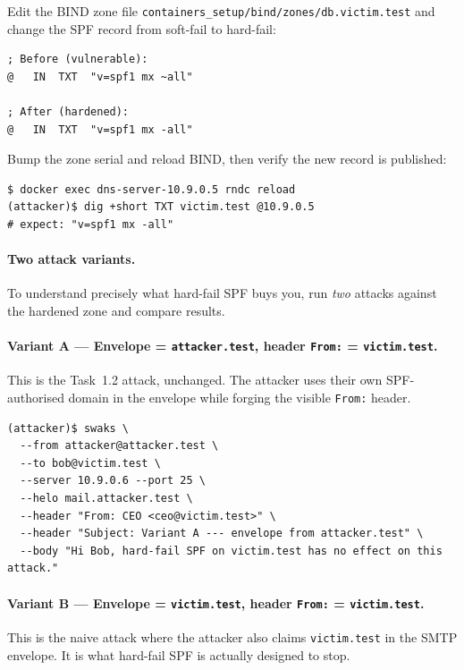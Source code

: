\documentclass[11pt]{article}
\begin{document}
Edit the BIND zone file
\texttt{containers\_setup/bind/zones/db.victim.test} and change the SPF
record from soft-fail to hard-fail:

\begin{listing}[H]
\begin{verbatim}
; Before (vulnerable):
@   IN  TXT  "v=spf1 mx ~all"

; After (hardened):
@   IN  TXT  "v=spf1 mx -all"
\end{verbatim}
\end{listing}

Bump the zone serial and reload BIND, then verify the new record is
published:

\begin{listing}[H]
\begin{verbatim}
$ docker exec dns-server-10.9.0.5 rndc reload
(attacker)$ dig +short TXT victim.test @10.9.0.5
# expect: "v=spf1 mx -all"
\end{verbatim}
\end{listing}

\paragraph{Two attack variants.}
To understand precisely what hard-fail SPF buys you, run \emph{two}
attacks against the hardened zone and compare results.

\paragraph{Variant A --- Envelope = \texttt{attacker.test}, header
\texttt{From:} = \texttt{victim.test}.}
This is the Task~1.2 attack, unchanged. The attacker uses their own
SPF-authorised domain in the envelope while forging the visible
\texttt{From:} header.

\begin{listing}[H]
\begin{verbatim}
(attacker)$ swaks \
  --from attacker@attacker.test \
  --to bob@victim.test \
  --server 10.9.0.6 --port 25 \
  --helo mail.attacker.test \
  --header "From: CEO <ceo@victim.test>" \
  --header "Subject: Variant A --- envelope from attacker.test" \
  --body "Hi Bob, hard-fail SPF on victim.test has no effect on this attack."
\end{verbatim}
\end{listing}

\paragraph{Variant B --- Envelope = \texttt{victim.test}, header
\texttt{From:} = \texttt{victim.test}.}
This is the naive attack where the attacker also claims
\texttt{victim.test} in the SMTP envelope. It is what hard-fail SPF is
actually designed to stop.
\end{document}
